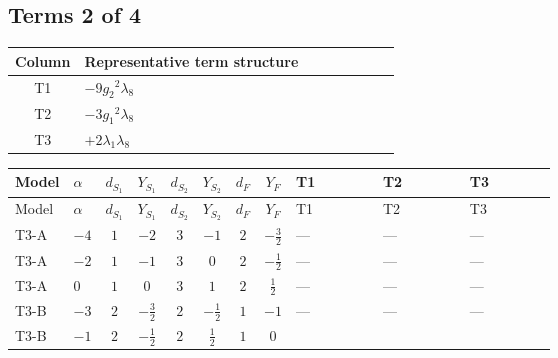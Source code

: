 \documentclass[8pt]{article}
\begin{document}
\begin{landscape}
\subsection*{Terms 2 of 4}
\begin{center}
\begin{tabular}{@{}c >{\raggedright\arraybackslash}p{0.82\linewidth}@{}}
\toprule
Column & Representative term structure \\
\midrule
T1 & \(\displaystyle -9 {g_2}^2 {\lambda_{8}}\) \\
\midrule
T2 & \(\displaystyle -3 {g_1}^2 {\lambda_{8}}\) \\
\midrule
T3 & \(\displaystyle +2 {\lambda_1} {\lambda_{8}}\) \\
\midrule
\bottomrule
\end{tabular}
\end{center}
\smallskip
\tiny
\begin{longtable}{@{}llcccccc >{\raggedright\arraybackslash}p{0.21\linewidth} >{\raggedright\arraybackslash}p{0.21\linewidth} >{\raggedright\arraybackslash}p{0.21\linewidth}@{}}
\toprule
Model & $\alpha$ & $d_{S_1}$ & $Y_{S_1}$ & $d_{S_2}$ & $Y_{S_2}$ & $d_F$ & $Y_F$ & T1 & T2 & T3 \\
\midrule
\endfirsthead
\toprule
Model & $\alpha$ & $d_{S_1}$ & $Y_{S_1}$ & $d_{S_2}$ & $Y_{S_2}$ & $d_F$ & $Y_F$ & T1 & T2 & T3 \\
\midrule
\endhead
T3-A & $-4$ & $1$ & $-2$ & $3$ & $-1$ & $2$ & $-\frac{3}{2}$ & --- & --- & --- \\
\midrule
T3-A & $-2$ & $1$ & $-1$ & $3$ & $0$ & $2$ & $-\frac{1}{2}$ & --- & --- & --- \\
\midrule
T3-A & $0$ & $1$ & $0$ & $3$ & $1$ & $2$ & $\frac{1}{2}$ & --- & --- & --- \\
\midrule
T3-B & $-3$ & $2$ & $-\frac{3}{2}$ & $2$ & $-\frac{1}{2}$ & $1$ & $-1$ & --- & --- & --- \\
\midrule
T3-B & $-1$ & $2$ & $-\frac{1}{2}$ & $2$ & $\frac{1}{2}$ & $1$ & $0$ & \scriptsize\adjustbox{max width=\linewidth}{$\begin{gathered} -9 {g_2}^2 {\lambda_{8}}\end{gathered}$} & \scriptsize\adjustbox{max width=\linewidth}{$\begin{gathered} -3 {g_1}^2 {\lambda_{8}}\end{gathered}$} & \scriptsize\adjustbox{max width=\linewidth}{$\begin{gathered} +2 {\lambda_1} {\lambda_{8}}\end{gathered}$} \\

\end{longtable}
\end{landscape}
\end{document}
